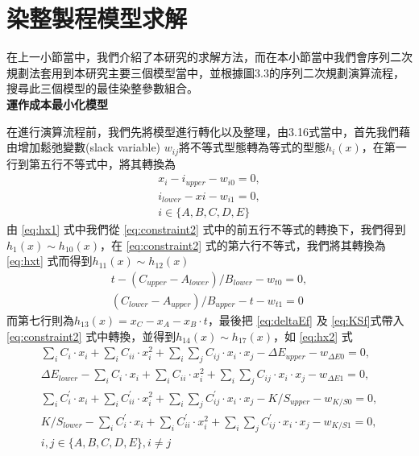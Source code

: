 \section{染整製程模型求解}
\label{c:ch5.3}
在上一小節當中，我們介紹了本研究的求解方法，而在本小節當中我們會序列二次規劃法套用到本研究主要三個模型當中，並根據圖3.3的序列二次規劃演算流程，搜尋此三個模型的最佳染整參數組合。
\\\textbf{運作成本最小化模型}

在進行演算流程前，我們先將模型進行轉化以及整理，由3.16式當中，首先我們藉由增加鬆弛變數(slack variable) $w_{ij}$將不等式型態轉為等式的型態$h_{i}(x)$，在第一行到第五行不等式中，將其轉換為
\begin{equation}
	\begin{array}{c}
	x_{i}-i_{upper}-w_{i0}=0,\\
	i_{lower}-x{i}-w_{i1}=0,\\
	i\in \{A,B,C,D,E\}
	\end{array}
\label{eq:hx1}
\end{equation}
由 \ref{eq:hx1} 式中我們從 \ref{eq:constraint2} 式中的前五行不等式的轉換下，我們得到$h_{1}(x) \sim h_{10}(x)$，在 \ref{eq:constraint2} 式的第六行不等式，我們將其轉換為 \ref{eq:hxt} 式而得到$h_{11}(x) \sim h_{12}(x)$
\begin{equation}
	\begin{array}{c}
	t-(C_{upper}-A_{lower})/B_{lower}-w_{t0}=0,\\
	(C_{lower}-A_{upper})/B_{upper}-t-w_{t1}=0
	\end{array}
\label{eq:hxt}
\end{equation}
而第七行則為$h_{13}(x)=x_C-x_A-x_B\cdot t$，最後把 \ref{eq:deltaEf} 及 \ref{eq:KSf}式帶入 \ref{eq:constraint2} 式中轉換，並得到$h_{14}(x) \sim h_{17}(x)$，如 \ref{eq:hx2} 式
\begin{equation}
	\begin{array}{c}
	\sum_i C_i\cdot x_i + \sum_i C_{ii}\cdot x_i^2+\sum_i\sum_j C_{ij}\cdot x_{i}\cdot x_{j}-\Delta E_{upper}-w_{\Delta E0}=0,\\
	\Delta E_{lower}-\sum_i C_i\cdot x_i + \sum_i C_{ii}\cdot x_i^2+\sum_i\sum_j C_{ij}\cdot x_{i}\cdot x_{j}-w_{\Delta E1}=0,\\
	\sum_i C_i^{'}\cdot x_i+ \sum_i C_{ii}^{'}\cdot x_i^2+\sum_i\sum_j C_{ij}^{'}\cdot x_{i}\cdot x_{j}-K/S_{upper}-w_{K/S0}=0,\\
	K/S_{lower}-\sum_i C_i^{'}\cdot x_i+ \sum_i C_{ii}^{'}\cdot x_i^2+\sum_i\sum_j C_{ij}^{'}\cdot x_{i}\cdot x_{j}-w_{K/S1}=0,\\
	i,j\in \{A,B,C,D,E\} , i\neq j
	\end{array}
\label{eq:hx2}
\end{equation}

